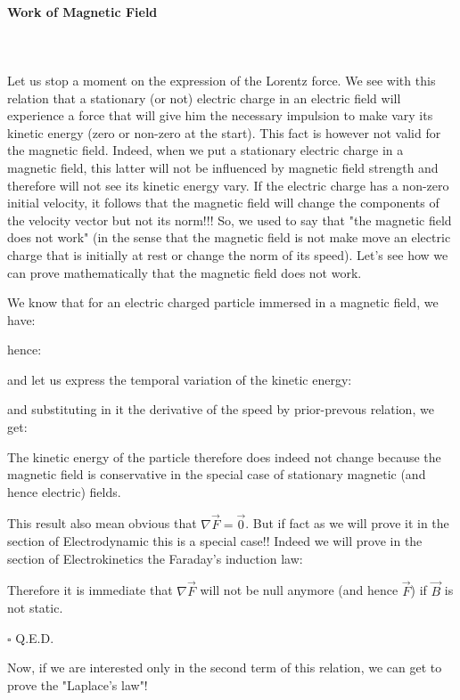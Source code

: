 	
	\paragraph{Work of Magnetic Field}\mbox{}\\\\
	Let us stop a moment on the expression of the Lorentz force. We see with this relation that a stationary (or not) electric charge in an electric field will experience a force that will give him the necessary impulsion to make vary its kinetic energy (zero or non-zero at the start). This fact is however not valid for the magnetic field. Indeed, when we put a stationary electric charge in a magnetic field, this latter will not be influenced by magnetic field strength and therefore will not see its kinetic energy vary. If the electric charge has a non-zero initial velocity, it follows that the magnetic field will change the components of the velocity vector but not its norm!!! So, we used to say that "the magnetic field does not work" (in the sense that the magnetic field is not make move an electric charge that is initially at rest or change the norm of its speed).
	Let's see how we can prove mathematically that the magnetic field does not work.
	\begin{dem}
	We know that for an electric charged particle immersed in a magnetic field, we have:
	
	hence:
	
	and let us express the temporal variation of the kinetic energy:
	
	and substituting in it the derivative of the speed by prior-prevous relation, we get:
	
	The kinetic energy of the particle therefore does indeed not change because the magnetic field is conservative in the special case of stationary magnetic (and hence electric) fields.
	
	This result also mean obvious that $\nabla{\vec{F}}=\vec{0}$. But if fact as we will prove it in the section of Electrodynamic this is a special case!! Indeed we will prove in the section of Electrokinetics the Faraday's induction law:
	
	Therefore it is immediate that $\nabla{\vec{F}}$ will not be null anymore (and hence $\vec{F}$) if $\vec{B}$ is not static.
	\begin{flushright}
		$\square$  Q.E.D.
	\end{flushright}
	\end{dem}
	Now, if we are interested only in the second term of this relation, we can get to prove the "Laplace's law"!

